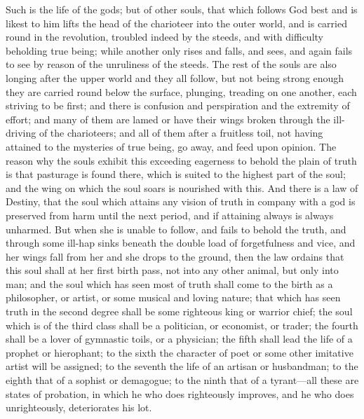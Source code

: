 \documentclass[11pt,letter]{article}
\begin{document}
\par  Such is the life of the gods; but of other souls, that which follows God best and is likest to him lifts the head of the charioteer into the outer world, and is carried round in the revolution, troubled indeed by the steeds, and with difficulty beholding true being; while another only rises and falls, and sees, and again fails to see by reason of the unruliness of the steeds. The rest of the souls are also longing after the upper world and they all follow, but not being strong enough they are carried round below the surface, plunging, treading on one another, each striving to be first; and there is confusion and perspiration and the extremity of effort; and many of them are lamed or have their wings broken through the ill-driving of the charioteers; and all of them after a fruitless toil, not having attained to the mysteries of true being, go away, and feed upon opinion. The reason why the souls exhibit this exceeding eagerness to behold the plain of truth is that pasturage is found there, which is suited to the highest part of the soul; and the wing on which the soul soars is nourished with this. And there is a law of Destiny, that the soul which attains any vision of truth in company with a god is preserved from harm until the next period, and if attaining always is always unharmed. But when she is unable to follow, and fails to behold the truth, and through some ill-hap sinks beneath the double load of forgetfulness and vice, and her wings fall from her and she drops to the ground, then the law ordains that this soul shall at her first birth pass, not into any other animal, but only into man; and the soul which has seen most of truth shall come to the birth as a philosopher, or artist, or some musical and loving nature; that which has seen truth in the second degree shall be some righteous king or warrior chief; the soul which is of the third class shall be a politician, or economist, or trader; the fourth shall be a lover of gymnastic toils, or a physician; the fifth shall lead the life of a prophet or hierophant; to the sixth the character of poet or some other imitative artist will be assigned; to the seventh the life of an artisan or husbandman; to the eighth that of a sophist or demagogue; to the ninth that of a tyrant—all these are states of probation, in which he who does righteously improves, and he who does unrighteously, deteriorates his lot.
\end{document}
